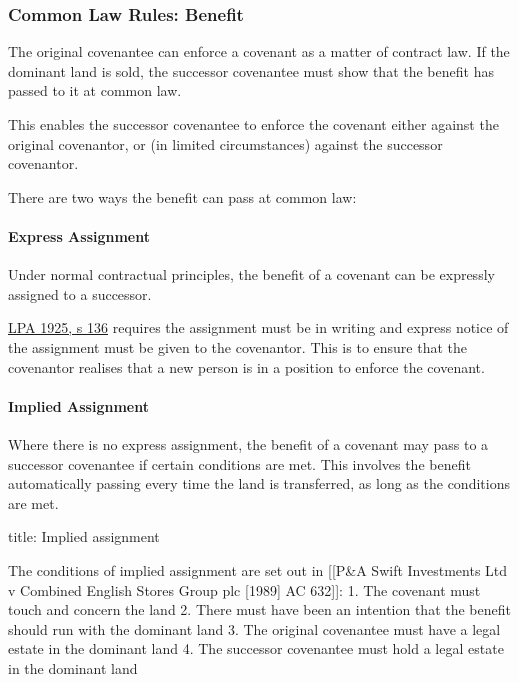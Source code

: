 \documentclass[
]{article}
\newenvironment{Shaded}{}{}
\newcommand{\NormalTok}[1]{#1}
\begin{document}
\hypertarget{common-law-rules-benefit}{%
\subsubsection{Common Law Rules:
Benefit}\label{common-law-rules-benefit}}

The original covenantee can enforce a covenant as a matter of contract
law. If the dominant land is sold, the successor covenantee must show
that the benefit has passed to it at common law.

This enables the successor covenantee to enforce the covenant either
against the original covenantor, or (in limited circumstances) against
the successor covenantor.

There are two ways the benefit can pass at common law:

\hypertarget{express-assignment}{%
\paragraph{Express Assignment}\label{express-assignment}}

Under normal contractual principles, the benefit of a covenant can be
expressly assigned to a successor.

\href{https://www.legislation.gov.uk/ukpga/Geo5/15-16/20/section/136}{LPA
1925, s 136} requires the assignment must be in writing and express
notice of the assignment must be given to the covenantor. This is to
ensure that the covenantor realises that a new person is in a position
to enforce the covenant.

\hypertarget{implied-assignment}{%
\paragraph{Implied Assignment}\label{implied-assignment}}

Where there is no express assignment, the benefit of a covenant may pass
to a successor covenantee if certain conditions are met. This involves
the benefit automatically passing every time the land is transferred, as
long as the conditions are met.

\begin{Shaded}
\begin{Highlighting}[]
\NormalTok{title: Implied assignment}

\NormalTok{The conditions of implied assignment are set out in [[P\&A Swift Investments Ltd v Combined English Stores Group plc [1989] AC 632]]:}
\NormalTok{1. The covenant must touch and concern the land}
\NormalTok{2. There must have been an intention that the benefit should run with the dominant land}
\NormalTok{3. The original covenantee must have a legal estate in the dominant land}
\NormalTok{4. The successor covenantee must hold a legal estate in the dominant land}
\end{Highlighting}
\end{Shaded}
\end{document}
